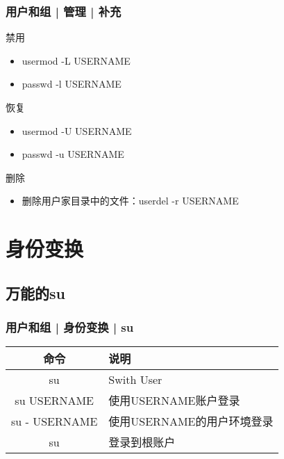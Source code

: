 \begin{frame}
  \frametitle{用户和组 | 管理 | 补充}
  \begin{block}{禁用}
    \begin{itemize}
      \item usermod -L USERNAME
      \item passwd -l USERNAME
    \end{itemize}
  \end{block}
  \pause
  \begin{block}{恢复}
    \begin{itemize}
      \item usermod -U USERNAME
      \item passwd -u USERNAME
    \end{itemize}
  \end{block}
  \pause
  \begin{block}{删除}
    \begin{itemize}
      \item 删除用户家目录中的文件：userdel -r USERNAME
    \end{itemize}
  \end{block}
\end{frame}

\section{身份变换}
\subsection{万能的su}
\begin{frame}
  \frametitle{用户和组 | 身份变换 | su}
  \begin{table}
    \centering
    \begin{tabular}{cl}
      \hline
      \rowcolor{blue!50}命令 & 说明\\
      \hline
      \alert{su} & Swith User\\
      \hline
      su USERNAME & 使用USERNAME账户登录\\
      su - USERNAME & 使用USERNAME的用户环境登录\\
      su & 登录到根账户\\
      \hline
    \end{tabular}
  \end{table}
\end{frame}

